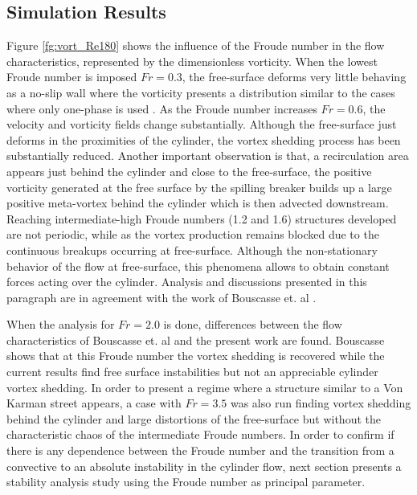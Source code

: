 \subsection{Simulation Results}

Figure \ref{fg:vort_Re180} shows the influence of the Froude number in the flow characteristics, represented by the dimensionless vorticity. When the lowest Froude number is imposed $Fr=0.3$, the free-surface deforms very little behaving as a no-slip wall where the vorticity presents a distribution similar to the cases where only one-phase is used \cite{PRICE2002175}. As the Froude number increases $Fr=0.6$, the velocity and vorticity fields change substantially. Although the free-surface just deforms in the proximities of the cylinder, the vortex shedding process has been substantially reduced. Another important observation is that, a recirculation area appears just behind the cylinder and close to the free-surface, the positive vorticity generated at the free surface by the spilling breaker builds up a large positive meta-vortex behind the cylinder which is then advected downstream. Reaching intermediate-high Froude numbers (1.2 and 1.6) structures developed are not periodic, while as the vortex production remains blocked due to the continuous breakups occurring at free-surface. Although the non-stationary behavior of the flow at free-surface, this phenomena allows to obtain constant forces acting over the cylinder. Analysis and discussions presented in this paragraph are in agreement with the work of Bouscasse et. al \cite{Bouscasse14}.

When the analysis for $Fr=2.0$ is done, differences between the flow characteristics of Bouscasse et. al \cite{Bouscasse14} and the present work are found. Bouscasse shows that at this Froude number the vortex shedding is recovered while the current results find free surface instabilities but not an appreciable cylinder vortex shedding. In order to present a regime where a structure similar to a Von Karman street appears, a case with $Fr=3.5$ was also run finding vortex shedding behind the cylinder and large distortions of the free-surface but without the characteristic chaos of the intermediate Froude numbers. In order to confirm if there is any dependence between the Froude number and the transition from a convective to an absolute instability in the cylinder flow, next section presents a stability analysis study using the Froude number as principal parameter.

